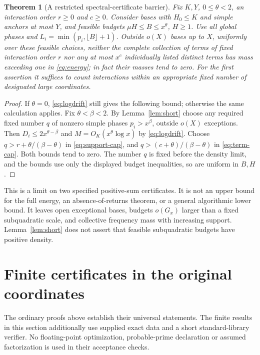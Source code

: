 \documentclass[11pt,a4paper]{article}
\newtheorem{theorem}{Theorem}[section]
\theoremstyle{definition}\newtheorem{question}[theorem]{Question}
\theoremstyle{remark}\newtheorem{remark}[theorem]{Remark}
\begin{document}
\begin{theorem}[A restricted spectral-certificate barrier]\label{thm:barrier}
Fix $K,Y$, $0\le\theta<2$, an interaction order $r\ge0$ and
$c\ge0$. Consider bases with $H_0\le K$ and simple anchors at most
$Y$, and feasible budgets $\mu H\le B\le x^\theta$, $H\ge1$.
Use all global phases and $L_i=\min(p_i,\lfloor B\rfloor+1)$.
Outside $o(X)$ bases up to $X$, uniformly over these feasible choices,
neither the complete collection of terms of fixed interaction order
$r$ nor any at most $x^c$ individually listed distinct terms has mass
exceeding one in \eqref{eq:energy}; in fact their masses tend to zero.
For the first assertion it suffices to count interactions within an
appropriate fixed number of designated large coordinates.
\end{theorem}
\begin{proof}
If $\theta=0$, \eqref{eq:logdrift} still gives the following bound;
otherwise the same calculation applies. Fix $\theta<\beta<2$.
By Lemma~\ref{lem:short} choose any required fixed number $q$ of
nonzero simple phases $p_i>x^\beta$, outside $o(X)$ exceptions.
Then $D_i\le2x^{\theta-\beta}$ and
$M=O_K(x^\theta\log x)$ by \eqref{eq:logdrift}.
Choose $q>r+\theta/(\beta-\theta)$ in \eqref{eq:support-cap},
and $q>(c+\theta)/(\beta-\theta)$ in \eqref{eq:term-cap}.
Both bounds tend to zero. The number $q$ is fixed before the density
limit, and the bounds use only the displayed budget inequalities,
so are uniform in $B,H$.
\end{proof}
This is a limit on two specified positive-sum certificates. It is
not an upper bound for the full energy, an absence-of-returns theorem,
or a general algorithmic lower bound. It leaves open exceptional bases,
budgets $o(G_x)$ larger than a fixed subquadratic scale, and collective
frequency mass with increasing support. Lemma~\ref{lem:short} does
not assert that feasible subquadratic budgets have positive density.

\section{Finite certificates in the original coordinates}\label{sec:finite}
The ordinary proofs above establish their universal statements.
The finite results in this section additionally use supplied exact data
and a short standard-library verifier. No floating-point optimization,
probable-prime declaration or assumed factorization is used in their
acceptance checks.
\end{document}
